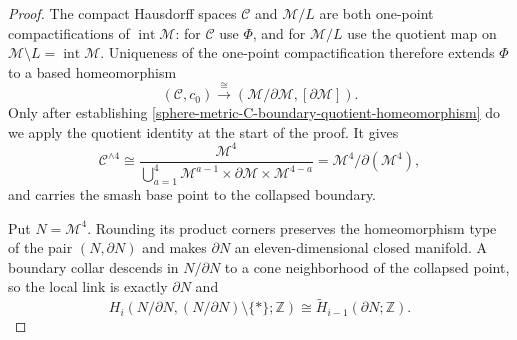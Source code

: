 \begin{proof}
The compact Hausdorff spaces \(\mathcal C\) and
\(\mathcal M/L\) are both one-point compactifications of
\(\operatorname{int}\mathcal M\): for \(\mathcal C\) use \(\Phi\), and for
\(\mathcal M/L\) use the quotient map on
\(\mathcal M\setminus L=\operatorname{int}\mathcal M\).  Uniqueness of the
one-point compactification therefore extends \(\Phi\) to a based
homeomorphism
\begin{equation}
 (\mathcal C,c_0)
 \xrightarrow{\ \cong\ }
 (\mathcal M/\partial\mathcal M,[\partial\mathcal M]).
 \label{sphere-metric-C-boundary-quotient-homeomorphism}
\end{equation}
Only after establishing
\eqref{sphere-metric-C-boundary-quotient-homeomorphism} do we apply the
quotient identity at the start of the proof.  It gives
\[
 \mathcal C^{\wedge4}
 \cong
 \frac{\mathcal M^4}
 {\displaystyle\bigcup_{a=1}^4
  \mathcal M^{a-1}\times\partial\mathcal M
  \times\mathcal M^{4-a}}
 =\mathcal M^4/\partial(\mathcal M^4),
\]
and carries the smash base point to the collapsed boundary.

Put \(N=\mathcal M^4\).  Rounding its product corners preserves the
homeomorphism type of the pair \((N,\partial N)\) and makes
\(\partial N\) an eleven-dimensional closed manifold.  A boundary collar
descends in \(N/\partial N\) to a cone neighborhood of the collapsed
point, so the local link is exactly \(\partial N\) and
\begin{equation}
 H_i(N/\partial N,(N/\partial N)\setminus\{*\};\mathbb Z)
 \cong\widetilde H_{i-1}(\partial N;\mathbb Z).
 \label{sphere-metric-boundary-link-local-shift}
\end{equation}


\end{proof}
